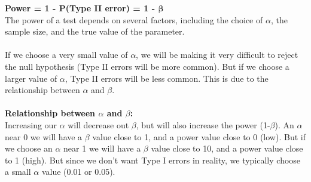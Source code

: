 \documentclass[12pt, a4paper]{article}
\begin{document}
	\textbf{Power = 1 - P(Type II error) = 1 - $\bm{\beta}$} \\
	The power of a test depends on several factors, including the choice of $\alpha$, the sample size, and the true value of the parameter. \\~\\
	If we choose a very small value of $\alpha$, we will be making it very difficult to reject the null hypothesis (Type II errors will be more common). But if we choose a larger value of $\alpha$, Type II errors will be less common. This is due to the relationship between $\alpha$ and $\beta$. \\~\\
	\textbf{Relationship between $\alpha$ and $\beta$:} \\
	Increasing our $\alpha$ will decrease out $\beta$, but will also increase the power (1-$\beta$). An $\alpha$ near 0 we will have a $\beta$ value close to 1, and a power value close to 0 (low). But if we choose an $\alpha$ near 1 we will have a $\beta$ value close to 10, and a power value close to 1 (high). But since we don't want Type I errors in reality, we typically choose a small $\alpha$ value (0.01 or 0.05). \newpage
	
\end{document}
